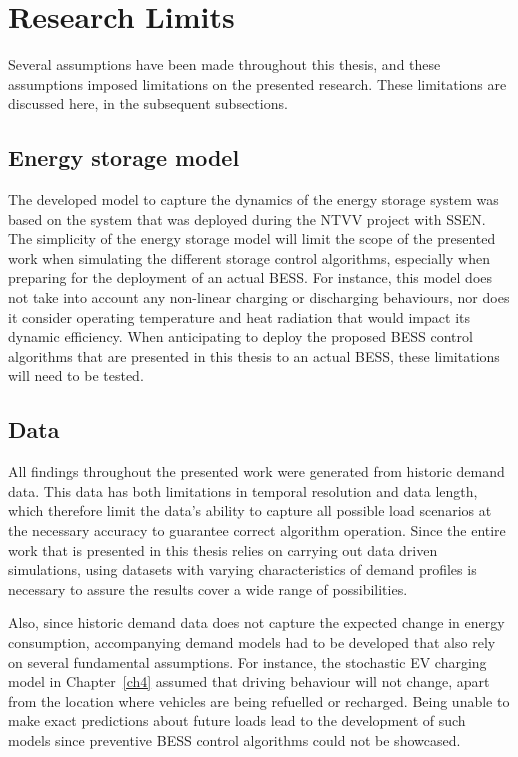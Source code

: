 \section{Research Limits}
\label{ch-conclusion:research-limits}

Several assumptions have been made throughout this thesis, and these assumptions imposed limitations on the presented research.
These limitations are discussed here, in the subsequent subsections.

\subsection{Energy storage model}

The developed model to capture the dynamics of the energy storage system was based on the system that was deployed during the NTVV project with SSEN.
The simplicity of the energy storage model will limit the scope of the presented work when simulating the different storage control algorithms, especially when preparing for the deployment of an actual BESS.
For instance, this model does not take into account any non-linear charging or discharging behaviours, nor does it consider operating temperature and heat radiation that would impact its dynamic efficiency.
When anticipating to deploy the proposed BESS control algorithms that are presented in this thesis to an actual BESS, these limitations will need to be tested.

\subsection{Data}

All findings throughout the presented work were generated from historic demand data.
This data has both limitations in temporal resolution and data length, which therefore limit the data's ability to capture all possible load scenarios at the necessary accuracy to guarantee correct algorithm operation.
Since the entire work that is presented in this thesis relies on carrying out data driven simulations, using datasets with varying characteristics of demand profiles is necessary to assure the results cover a wide range of possibilities.

Also, since historic demand data does not capture the expected change in energy consumption, accompanying demand models had to be developed that also rely on several fundamental assumptions.
For instance, the stochastic EV charging model in Chapter~\ref{ch4} assumed that driving behaviour will not change, apart from the location where vehicles are being refuelled or recharged.
Being unable to make exact predictions about future loads lead to the development of such models since preventive BESS control algorithms could not be showcased.

